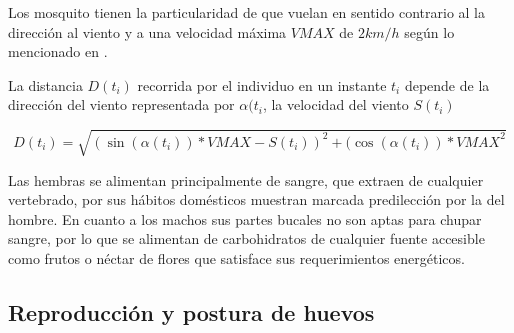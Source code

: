 Los mosquito tienen la particularidad de que vuelan en sentido contrario
al la dirección al viento y a una velocidad máxima $VMAX$ de $2 km/h$ según lo
mencionado en \cite{web-site:speedAnimals}.

La distancia $D(t_{i})$ recorrida por el individuo en un instante $t_{i}$
depende de la dirección del viento representada por $\alpha(t_{i}$, la
velocidad del viento $S(t_{i})$

\begin{equation}
 D (t_{i}) = \sqrt{{(\sin(\alpha(t_{i})) * VMAX  - S(t_{i}))}^{2}
  + {(\cos(\alpha(t_{i})) * VMAX} ^{2} }
\end{equation}

Las hembras se alimentan principalmente de sangre, que extraen de cualquier
vertebrado, por sus hábitos domésticos muestran marcada predilección por
la del hombre\cite{ThironIzcazaJ2003}. En cuanto a los machos sus partes
bucales no son aptas para chupar sangre, por lo que se alimentan de
carbohidratos de cualquier fuente accesible como frutos o néctar de flores
que satisface sus requerimientos energéticos.

\subsection{Reproducción y postura de huevos}
